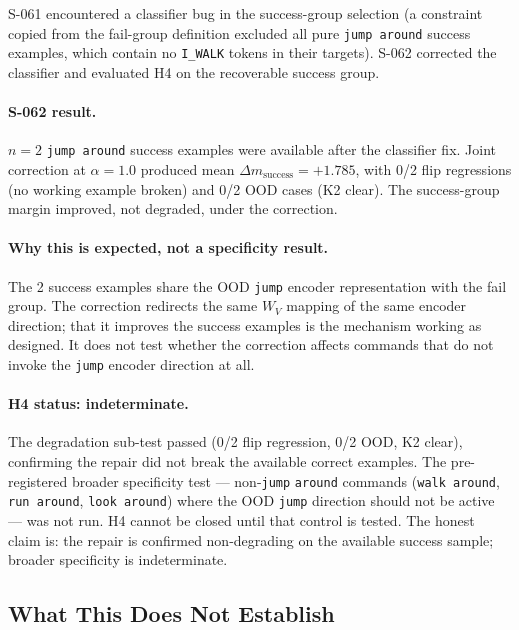 S-061 encountered a classifier bug in the success-group selection (a constraint copied
from the fail-group definition excluded all pure \texttt{jump around} success examples,
which contain no \texttt{I\_WALK} tokens in their targets).
S-062 corrected the classifier and evaluated H4 on the recoverable success group.

\paragraph{S-062 result.}
$n=2$ \texttt{jump around} success examples were available after the classifier fix.
Joint correction at $\alpha=1.0$ produced mean $\Delta m_\text{success}=+1.785$,
with 0/2 flip regressions (no working example broken) and 0/2 OOD cases (K2 clear).
The success-group margin improved, not degraded, under the correction.

\paragraph{Why this is expected, not a specificity result.}
The 2 success examples share the OOD \texttt{jump} encoder representation with the
fail group.
The correction redirects the same $W_V$ mapping of the same encoder direction;
that it improves the success examples is the mechanism working as designed.
It does not test whether the correction affects commands that do not invoke the
\texttt{jump} encoder direction at all.

\paragraph{H4 status: indeterminate.}
The degradation sub-test passed (0/2 flip regression, 0/2 OOD, K2 clear), confirming
the repair did not break the available correct examples.
The pre-registered broader specificity test --- non-\texttt{jump} \texttt{around}
commands (\texttt{walk around}, \texttt{run around}, \texttt{look around}) where the
OOD \texttt{jump} direction should not be active --- was not run.
H4 cannot be closed until that control is tested.
The honest claim is: the repair is confirmed non-degrading on the available success
sample; broader specificity is indeterminate.

\subsection{What This Does Not Establish}

